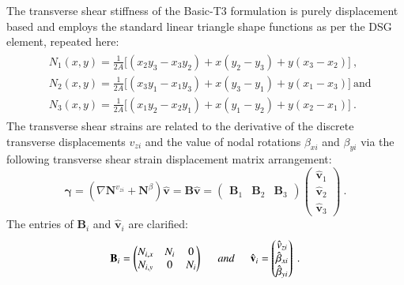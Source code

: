The transverse shear stiffness of the Basic-T3 formulation is purely displacement based and employs the standard linear triangle shape functions as per the DSG element, repeated here:
\begin{gather} 
\begin{aligned}
&N_1 (x , y) = \frac{1}{2 A} \big[ (x_2 y_3 - x_3 y_2) + x(y_2 - y_3) + y(x_3 - x_2) \big]\ ,
\\
&N_2 (x , y) = \frac{1}{2 A} \big[ (x_3 y_1 - x_1 y_3) + x(y_3 - y_1) + y(x_1 - x_3) \big]\  \text{and}
\\
&N_3 (x , y) = \frac{1}{2 A} \big[ (x_1 y_2 - x_2 y_1) + x(y_1 - y_2) + y(x_2 - x_1) \big]
\label{eqApp2_1}\ .
\end{aligned}
\end{gather}
The transverse shear strains are related to the derivative of the discrete transverse displacements $v_{zi}$ and the value of nodal rotations $\beta_{xi}$ and $\beta_{yi}$ via the following transverse shear strain displacement matrix arrangement:
\begin{equation}
\boldsymbol{\gamma} = (\nabla \mathbf{N}^{v_{zi}} + \mathbf{N}^{\beta} ) \hat{\mathbf{v}} 
= \mathbf{B} \hat{\mathbf{v}}  = 
\begin{pmatrix}
\mathbf{B}_1 & \mathbf{B}_2 & \mathbf{B}_3 
\end{pmatrix}
\begin{pmatrix}
\hat{\mathbf{v}}_1 \\
 \hat{\mathbf{v}}_2 \\
  \hat{\mathbf{v}}_3 
\end{pmatrix}
\label{eqApp2_2}\ .
\end{equation}
The entries of $\mathbf{B}_i$ and $\hat{\mathbf{v}}_i $ are clarified:
\begin{equation}
\mathbf{B}_i=  \begin{pmatrix}
{N}_{i,x} & {N}_i & 0\\
{N}_{i,y} & 0 & {N}_i 
\end{pmatrix}
\hspace{5mm}
and
\hspace{5mm}
\hat{\mathbf{v}}_i =  \begin{pmatrix}
\hat{v}_{zi}\\
\hat{\beta}_{xi}\\
\hat{\beta}_{yi}
\end{pmatrix}
\label{eqApp2_3}\ .
\end{equation}